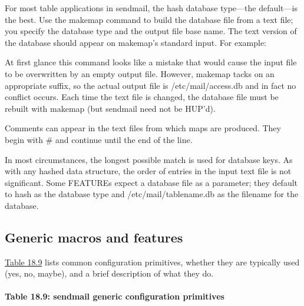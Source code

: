 For most table applications in {sendmail}, the {hash} database
type---the default---is the best. Use the
\protect\hypertarget{part0026_split_033.htmlux5cux23_idIndexMarker2513}{}{}{makemap}
command to build the database file from a text file; you specify the
database type and the output file base name. The text version of the
database should appear on {makemap}'s standard input. For example:


At first glance this command looks like a mistake that would cause the
input file to be overwritten by an empty output file. However, {makemap}
tacks on an appropriate suffix, so the actual output file is
{/etc/mail/access.db} and in fact no conflict occurs. Each time the text
file is changed, the database file must be rebuilt with {makemap} (but
{sendmail} need not be HUP'd).

Comments can appear in the text files from which maps are produced. They
begin with {\#} and continue until the end of the line.

In most circumstances, the longest possible match is used for database
keys. As with any hashed data structure, the order of entries in the
input text file is not significant. Some {FEATURE}s expect a database
file as a parameter; they default to {hash} as the database type and
{/etc/mail/}{tablename}{.db} as the filename for the database.

\protect\hypertarget{part0026_split_034.html}{}{}

\hypertarget{part0026_split_034.htmlux5cux23_idContainer1247}{}
\hypertarget{part0026_split_034.htmlux5cux23calibre_pb_33}{%
\subsection[Generic macros and
features]{\texorpdfstring{\protect\hypertarget{part0026_split_034.htmlux5cux23_idTextAnchor1064}{}{}Generic
macros and
features}{Generic macros and features}}\label{part0026_split_034.htmlux5cux23calibre_pb_33}}

\protect\hyperlink{part0026_split_034.htmlux5cux23_idTextAnchor1065}{Table
18.9} lists common configuration primitives, whether they are typically
used (yes, no, maybe), and a brief description of what they do.

\paragraph[{Table 18.9: } generic configuration
primitives]{\texorpdfstring{{Table 18.9:
}{\protect\hypertarget{part0026_split_034.htmlux5cux23_idIndexMarker2514}{}{}}{\protect\hypertarget{part0026_split_034.htmlux5cux23_idTextAnchor1065}{}{}\protect\hypertarget{part0026_split_034.htmlux5cux23_idTextAnchor1066}{}{}sendmail}
generic configuration
primitives}{Table 18.9: sendmail generic configuration primitives}}

